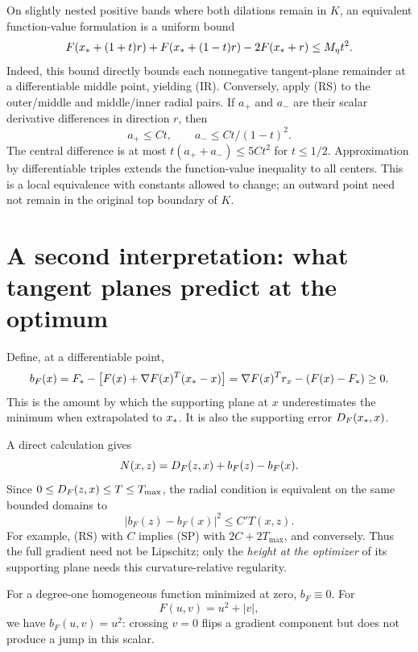 On slightly nested positive bands where both dilations remain in $K$, an equivalent function-value formulation is a uniform bound
\begin{equation}
 F(x_*+(1+t)r)+F(x_*+(1-t)r)-2F(x_*+r)\le M_\eta t^2.
 \label{R:eq:central}
\end{equation}
Indeed, this bound directly bounds each nonnegative tangent-plane remainder at a differentiable middle point, yielding (IR). Conversely, apply (RS) to the outer/middle and middle/inner radial pairs. If $a_+$ and $a_-$ are their scalar derivative differences in direction $r$, then
\[
 a_+\le C t,\qquad a_-\le Ct/(1-t)^2.
\]
The central difference is at most $t(a_++a_-)\le5Ct^2$ for $t\le1/2$. Approximation by differentiable triples extends the function-value inequality to all centers. This is a local equivalence with constants allowed to change; an outward point need not remain in the original top boundary of $K$.


\setcounter{section}{2}
\setcounter{theorem}{0}
\setcounter{equation}{4}


\section{A second interpretation: what tangent planes predict at the optimum}
Define, at a differentiable point,
\[
 b_F(x)=F_*-\bigl[F(x)+\nabla F(x)^T(x_*-x)\bigr]
       =\nabla F(x)^Tr_x-(F(x)-F_*)\ge0.
\]
This is the amount by which the supporting plane at $x$ underestimates the minimum when extrapolated to $x_*$. It is also the supporting error $D_F(x_*,x)$.

A direct calculation gives
\begin{equation}
 N(x,z)=D_F(z,x)+b_F(z)-b_F(x).
 \label{R:eq:intercept}
\end{equation}
Since $0\le D_F(z,x)\le T\le T_{\max}$, the radial condition is equivalent on the same bounded domains to
\begin{equation}
 |b_F(z)-b_F(x)|^2\le C' T(x,z).
 \tag{4.SP}\label{R:eq:SP}
\end{equation}
For example, (RS) with $C$ implies (SP) with $2C+2T_{\max}$, and conversely. Thus the full gradient need not be Lipschitz; only the \emph{height at the optimizer} of its supporting plane needs this curvature-relative regularity.

For a degree-one homogeneous function minimized at zero, $b_F\equiv0$. For
\[
 F(u,v)=u^2+|v|,
\]
we have $b_F(u,v)=u^2$: crossing $v=0$ flips a gradient component but does not produce a jump in this scalar.

